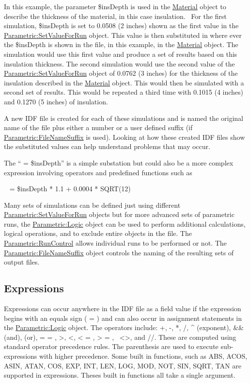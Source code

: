 In this example, the parameter \$insDepth is used in the \hyperref[material]{Material} object to describe the thickness of the material, in this case insulation.~ For the first simulation, \$insDepth is set to 0.0508 (2 inches) shown as the first value in the \hyperref[parametricsetvalueforrun]{Parametric:SetValueForRun} object. This value is then substituted in where ever the \$insDepth is shown in the file, in this example, in the \hyperref[material]{Material} object. The simulation would use this first value and produce a set of results based on this insulation thickness. The second simulation would use the second value of the \hyperref[parametricsetvalueforrun]{Parametric:SetValueForRun} object of 0.0762 (3 inches) for the thickness of the insulation described in the \hyperref[material]{Material} object. This would then be simulated with a second set of results. This would be repeated a third time with 0.1015 (4 inches) and 0.1270 (5 inches) of insulation.

A new IDF file is created for each of these simulations and is named the original name of the file plus either a number or a user defined suffix (if \hyperref[parametricfilenamesuffix]{Parametric:FileNameSuffix} is used). Looking at how these created IDF files show the substituted values can help understand problems that may occur.

The `` = \$insDepth'' is a simple substation but could also be a more complex expression involving operators and predefined functions such as

~ = \$insDepth * 1.1 + 0.0004 * SQRT(12)

Many sets of simulations can be defined just using different \hyperref[parametricsetvalueforrun]{Parametric:SetValueForRun} objects but for more advanced sets of parametric runs, the \hyperref[parametriclogic]{Parametric:Logic} object can be used to perform additional calculations, logical operations, and to exclude entire objects in the file. The \hyperref[parametricruncontrol]{Parametric:RunControl} allows individual runs to be performed or not. The \hyperref[parametricfilenamesuffix]{Parametric:FileNameSuffix} object controls the naming of the resulting sets of output files.

\subsection{Expressions}\label{expressions}

Expressions can occur anywhere in the IDF file as a field value if the expression begins with an equals sign ( = ) and can also occur in assignment statements in the \hyperref[parametriclogic]{Parametric:Logic} object. The operators include: +, -, *, /, \^{} (exponent), \&\& (and), \textbar{}\textbar{} (or), = = , \textgreater{}, \textless{}, \textless{} = , \textgreater{} = ,~ \textless{}\textgreater{}, and //. These are computed using standard operator precedence rules. The parenthesis are used to execute sub-expressions with higher precedence. Some built in functions, such as ABS, ACOS, ASIN, ATAN, COS, EXP, INT, LEN, LOG, MOD, NOT, SIN, SQRT, TAN are supported in expressions. Theses built in functions all take a single argument.

